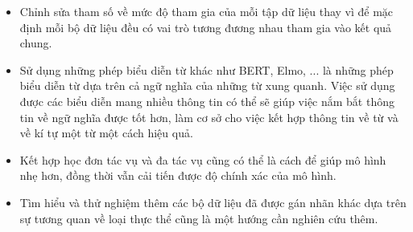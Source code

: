 \documentclass[../main.tex]{subfiles}
\begin{document}
\begin{itemize}

\item Chỉnh sửa tham số về mức độ tham gia của mỗi tập dữ liệu thay vì để mặc định mỗi bộ dữ liệu đều có vai trò tương đương nhau tham gia vào kết quả chung. 

\item Sử dụng những phép biểu diễn từ khác như BERT, Elmo, ... là những phép biểu diễn từ dựa trên cả ngữ nghĩa của những từ xung quanh. Việc sử dụng được các biểu diễn mang nhiều thông tin có thể sẽ giúp việc nắm bắt thông tin về ngữ nghĩa được tốt hơn, làm cơ sở cho việc kết hợp thông tin về từ và về kí tự một từ một cách hiệu quả. 

\item Kết hợp học đơn tác vụ và đa tác vụ cũng có thể là cách để giúp mô hình nhẹ hơn, đồng thời vẫn cải tiến được độ chính xác của mô hình. 

\item Tìm hiểu và thử nghiệm thêm các bộ dữ liệu đã được gán nhãn khác dựa trên sự tương quan về loại thực thể cũng là một hướng cần nghiên cứu  thêm.  

\end{itemize}
\end{document}
